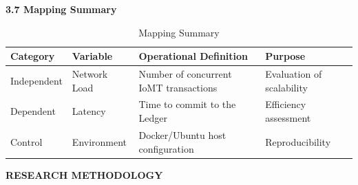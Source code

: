 \documentclass[12pt, a4paper]{report}
\begin{document}
\vspace{0.5cm}
{\color{myblue} \Large \bfseries 3.7 Mapping Summary}
\renewcommand{\arraystretch}{1.5} %
\begin{table}[htbp]
    \centering

    \label{tab:mapping_summary}
    \begin{tabularx}{\textwidth}{|>{\centering\arraybackslash}p{2.5cm}|>{\centering\arraybackslash}p{2.5cm}|>{\centering\arraybackslash}X|>{\centering\arraybackslash}X|}
        \hline
        \rowcolor{myblue!20} \bfseries Category & \bfseries Variable & \bfseries Operational Definition & \bfseries Purpose \\ \hline
        Independent & Network Load & Number of concurrent IoMT transactions & Evaluation of scalability \\ \hline
        Dependent & Latency & Time to commit to the Ledger & Efficiency assessment \\ \hline
        Control & Environment & Docker/Ubuntu host configuration & Reproducibility \\ \hline
    \end{tabularx}
        \caption{Mapping Summary}
\end{table}


\vspace{0.0cm}
{\color{myblue} \Huge \bfseries RESEARCH METHODOLOGY}
\renewcommand{\bibname}{\color{myblue} \Huge \bfseries References} %


\end{document}

